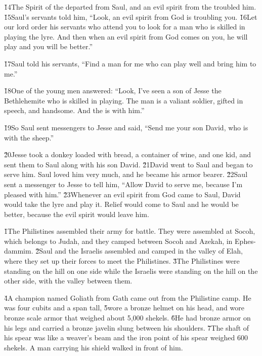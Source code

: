 \v{14}The Spirit of the  departed from Saul, and an evil spirit from the  troubled him. \v{15}Saul's servants told him, ``Look, an evil spirit from God is troubling you. \v{16}Let our lord order his servants who attend you to look for a man who is skilled in playing the lyre. And then when an evil spirit from God comes on you, he will play and you will be better.''

\v{17}Saul told his servants, ``Find a man for me who can play well and bring him to me.''

\v{18}One of the young men answered: ``Look, I've seen a son of Jesse the Bethlehemite who is skilled in playing. The man is a valiant soldier, gifted in speech, and handsome. And the  is with him.''

\v{19}So Saul sent messengers to Jesse and said, ``Send me your son David, who is with the sheep.''

\v{20}Jesse took a donkey loaded with bread, a container of wine, and one kid, and sent them to Saul along with his son David. \v{21}David went to Saul and began to serve him. Saul loved him very much, and he became his armor bearer. \v{22}Saul sent a messenger to Jesse to tell him, ``Allow David to serve me, because I'm pleased with him.'' \v{23}Whenever an evil spirit from God came to Saul, David would take the lyre and play it. Relief would come to Saul and he would be better, because the evil spirit would leave him.

\v{1}The Philistines assembled their army for battle. They were assembled at Socoh, which belongs to Judah, and they camped between Socoh and Azekah, in Ephes-dammim. \v{2}Saul and the Israelis assembled and camped in the valley of Elah, where they set up their forces to meet the Philistines. \v{3}The Philistines were standing on the hill on one side while the Israelis were standing on the hill on the other side, with the valley between them.

\v{4}A champion named Goliath from Gath came out from the Philistine camp. He was four cubits and a span tall, \v{5}wore a bronze helmet on his head, and wore bronze scale armor that weighed about 5,000 shekels. \v{6}He had bronze armor on his legs and carried a bronze javelin slung between his shoulders. \v{7}The shaft of his spear was like a weaver's beam and the iron point of his spear weighed 600 shekels. A man carrying his shield walked in front of him.

